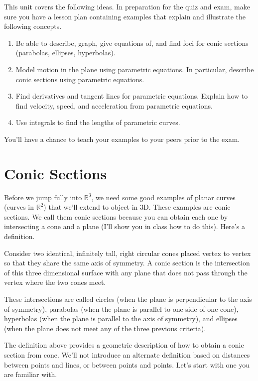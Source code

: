 
\noindent 
This unit covers the following ideas. In preparation for the quiz and exam, make sure you have a lesson plan containing examples that explain and illustrate the following concepts.  
\begin{enumerate}

\item Be able to describe, graph, give equations of, and find foci for conic sections (parabolas, ellipses, hyperbolas). 
\item Model motion in the plane using parametric equations. In particular, describe conic sections using parametric equations. 
\item Find derivatives and tangent lines for parametric equations. Explain how to find velocity, speed, and acceleration from parametric equations.
\item Use integrals to find the lengths of parametric curves.

\end{enumerate}
You'll have a chance to teach your examples to your peers prior to the exam.


\section{Conic Sections}
Before we jump fully into $\mathbb{R}^3$, we need some good examples of planar curves (curves in $\mathbb{R}^2$) that we'll extend to object in 3D.  These examples are conic sections. We call them conic sections because you can obtain each one by intersecting a cone and a plane (I'll show you in class how to do this).  Here's a definition.

\begin{definition}
Consider two identical, infinitely tall, right circular cones placed
vertex to vertex so that they share the same axis of symmetry.  A conic
section is the intersection of this three dimensional surface with any plane that does
not pass through the vertex where the two cones meet.
\end{definition}

These intersections are called circles (when the plane is perpendicular to the axis of symmetry),
parabolas (when the plane is parallel to one side of one cone), hyperbolas (when the plane
is parallel to the axis of symmetry), and ellipses (when the plane does not meet any of the
three previous criteria). 

The definition above provides a geometric description of how to obtain a conic section from cone.  We'll not introduce an alternate definition based on distances between points and lines, or between points and points.  Let's start with one you are familiar with.

